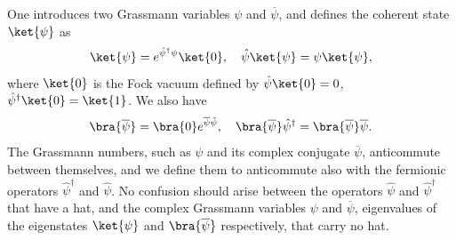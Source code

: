 One introduces two Grassmann variables \(\psi\) and \(\overline{\psi}\), and defines the coherent state \(\ket{\psi}\) as
\[
    \ket{\psi} = e^{\hat{\psi}^\dagger \psi} \ket{0}, \quad \hat{\psi} \ket{\psi} = \psi \ket{\psi},
\]
where \(\ket{0}\) is the Fock vacuum defined by \(\hat{\psi} \ket{0} = 0\), \(\hat{\psi}^\dagger \ket{0} = \ket{1}\). We also have
\[
    \bra{\overline{\psi}} = \bra{0} e^{\overline{\psi} \hat{\psi}}, \quad \bra{\overline{\psi}} \hat{\psi}^\dagger = \bra{\overline{\psi}} \overline{\psi}.
\]
The Grassmann numbers, such as \(\psi\) and its complex conjugate \(\overline{\psi}\), anticommute between themselves, and we define them to anticommute also with the fermionic operators \(\hat{\psi}^\dagger\) and \(\hat{\psi}\). No confusion should arise between the operators \(\hat{\psi}\) and \(\hat{\psi}^\dagger\) that have a hat, and the complex Grassmann variables \(\psi\) and \(\overline{\psi}\), eigenvalues of the eigenstates \(\ket{\psi}\) and \(\bra{\overline{\psi}}\) respectively, that carry
no hat.


